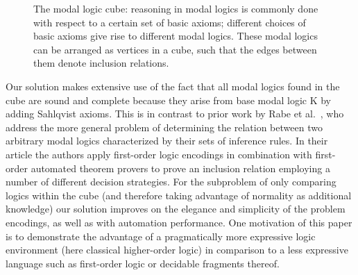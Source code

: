 \begin{isabellebody}
\begin{isamarkuptext}
\begin{figure}[tp]
{
}
\caption{The modal logic cube: 
reasoning in modal logics is commonly done with
respect to a certain set of basic axioms; different choices of basic
axioms give rise to different modal logics. These modal logics can be
arranged as vertices in a cube, such that the edges between them
denote inclusion relations.
}
\label{fig1}
\end{figure}

Our solution makes extensive use of the fact that all modal logics found in the cube
are sound and complete because they arise from base modal logic K by adding Sahlqvist axioms.
This is in contrast to prior work by Rabe et al.~\cite{Rabe}, who address the more general problem of determining the
relation between two arbitrary modal logics characterized by their sets of inference
rules. In their article the authors apply first-order logic encodings in combination with first-order
automated theorem provers to prove an inclusion relation employing a number of different decision strategies.
For the subproblem of only comparing logics within the cube (and therefore taking advantage of normality as additional knowledge)
our solution improves on the elegance and simplicity of the problem encodings, as well as with automation performance.
One motivation of this paper is to demonstrate the advantage of a pragmatically more expressive logic
environment (here classical higher-order logic) in comparison to a less expressive language such as
first-order logic or decidable fragments thereof.


\end{isamarkuptext}
\end{isabellebody}
